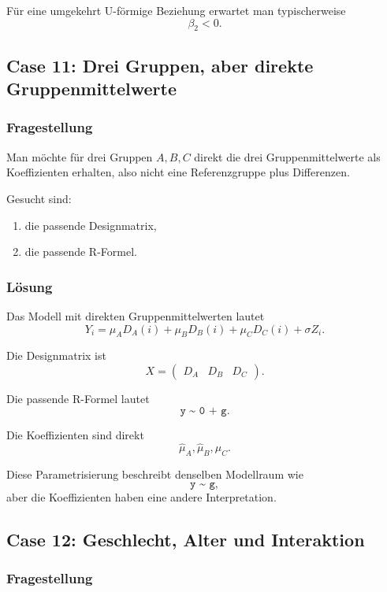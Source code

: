 \documentclass[10pt, letterpaper]{article}
\begin{document}
Für eine umgekehrt U-förmige Beziehung erwartet man typischerweise
\[
\beta_2<0.
\]

\subsection{Case 11: Drei Gruppen, aber direkte Gruppenmittelwerte}

\subsubsection*{Fragestellung}

Man möchte für drei Gruppen \(A,B,C\) direkt die drei Gruppenmittelwerte als Koeffizienten erhalten, also nicht eine Referenzgruppe plus Differenzen.

Gesucht sind:
\begin{enumerate}
    \item die passende Designmatrix,
    \item die passende R-Formel.
\end{enumerate}

\subsubsection*{Lösung}

Das Modell mit direkten Gruppenmittelwerten lautet
\[
Y_i=\mu_AD_A(i)+\mu_BD_B(i)+\mu_CD_C(i)+\sigma Z_i.
\]

Die Designmatrix ist
\[
X=
\begin{pmatrix}
D_A & D_B & D_C
\end{pmatrix}.
\]

Die passende R-Formel lautet
\[
\texttt{y \textasciitilde{} 0 + g}.
\]

Die Koeffizienten sind direkt
\[
\widehat\mu_A,\widehat\mu_B,\widehat\mu_C.
\]

Diese Parametrisierung beschreibt denselben Modellraum wie
\[
\texttt{y \textasciitilde{} g},
\]
aber die Koeffizienten haben eine andere Interpretation.

\subsection{Case 12: Geschlecht, Alter und Interaktion}

\subsubsection*{Fragestellung}
\end{document}
